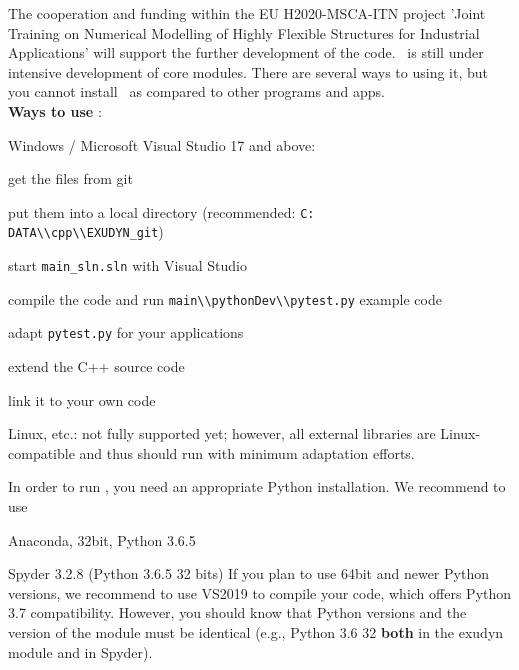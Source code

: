 The cooperation and funding within the EU H2020-MSCA-ITN project 'Joint Training on Numerical Modelling of Highly Flexible Structures for Industrial Applications' will support the further development of the code.
%
\codeName\ is still under intensive development of core modules.
There are several ways to using it, but you cannot install \codeName\ as compared to other programs and apps.
\vspace{6pt}\\
{\bf Ways to use \codeName }:
\bi
	\item Windows / Microsoft Visual Studio 17 and above:
	\bi
		\item get the files from git
		\item put them into a local directory (recommended: \texttt{C:\\DATA\textbackslash\textbackslash cpp\textbackslash\textbackslash EXUDYN\_git})
		\item start \texttt{main\_sln.sln} with Visual Studio
		\item compile the code and run \texttt{main\textbackslash\textbackslash pythonDev\textbackslash\textbackslash pytest.py} example code
		\item adapt \texttt{pytest.py} for your applications
		\item extend the C++ source code
		\item link it to your own code
	\ei
	\item Linux, etc.: not fully supported yet; however, all external libraries are Linux-compatible and thus should run with minimum adaptation efforts.
\ei
%

In order to run \codeName , you need an appropriate Python installation.
We recommend to use
\bi
  \item Anaconda, 32bit, Python 3.6.5
	\item Spyder 3.2.8 (Python 3.6.5 32 bits)	
\ei
If you plan to use 64bit and newer Python versions, we recommend to use VS2019 to compile your code, which offers Python 3.7 compatibility.
However, you should know that Python versions and the version of the module must be identical (e.g., Python 3.6 32 {\bf both} in the exudyn module and in Spyder).

